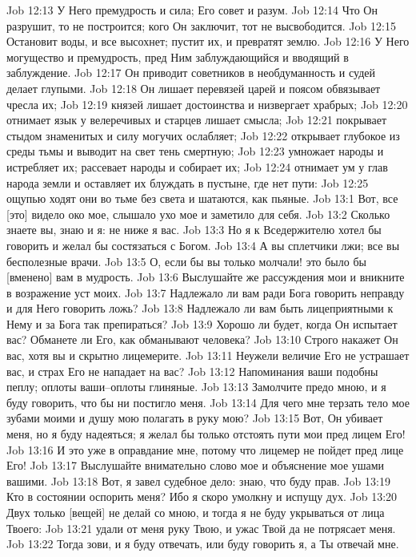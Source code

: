 Job 12:13  У Него премудрость и сила; Его совет и разум.
Job 12:14  Что Он разрушит, то не построится; кого Он заключит, тот не высвободится.
Job 12:15  Остановит воды, и все высохнет; пустит их, и превратят землю.
Job 12:16  У Него могущество и премудрость, пред Ним заблуждающийся и вводящий в заблуждение.
Job 12:17  Он приводит советников в необдуманность и судей делает глупыми.
Job 12:18  Он лишает перевязей царей и поясом обвязывает чресла их;
Job 12:19  князей лишает достоинства и низвергает храбрых;
Job 12:20  отнимает язык у велеречивых и старцев лишает смысла;
Job 12:21  покрывает стыдом знаменитых и силу могучих ослабляет;
Job 12:22  открывает глубокое из среды тьмы и выводит на свет тень смертную;
Job 12:23  умножает народы и истребляет их; рассевает народы и собирает их;
Job 12:24  отнимает ум у глав народа земли и оставляет их блуждать в пустыне, где нет пути:
Job 12:25  ощупью ходят они во тьме без света и шатаются, как пьяные.
Job 13:1  Вот, все [это] видело око мое, слышало ухо мое и заметило для себя.
Job 13:2  Сколько знаете вы, знаю и я: не ниже я вас.
Job 13:3  Но я к Вседержителю хотел бы говорить и желал бы состязаться с Богом.
Job 13:4  А вы сплетчики лжи; все вы бесполезные врачи.
Job 13:5  О, если бы вы только молчали! это было бы [вменено] вам в мудрость.
Job 13:6  Выслушайте же рассуждения мои и вникните в возражение уст моих.
Job 13:7  Надлежало ли вам ради Бога говорить неправду и для Него говорить ложь?
Job 13:8  Надлежало ли вам быть лицеприятными к Нему и за Бога так препираться?
Job 13:9  Хорошо ли будет, когда Он испытает вас? Обманете ли Его, как обманывают человека?
Job 13:10  Строго накажет Он вас, хотя вы и скрытно лицемерите.
Job 13:11  Неужели величие Его не устрашает вас, и страх Его не нападает на вас?
Job 13:12  Напоминания ваши подобны пеплу; оплоты ваши--оплоты глиняные.
Job 13:13  Замолчите предо мною, и я буду говорить, что бы ни постигло меня.
Job 13:14  Для чего мне терзать тело мое зубами моими и душу мою полагать в руку мою?
Job 13:15  Вот, Он убивает меня, но я буду надеяться; я желал бы только отстоять пути мои пред лицем Его!
Job 13:16  И это уже в оправдание мне, потому что лицемер не пойдет пред лице Его!
Job 13:17  Выслушайте внимательно слово мое и объяснение мое ушами вашими.
Job 13:18  Вот, я завел судебное дело: знаю, что буду прав.
Job 13:19  Кто в состоянии оспорить меня? Ибо я скоро умолкну и испущу дух.
Job 13:20  Двух только [вещей] не делай со мною, и тогда я не буду укрываться от лица Твоего:
Job 13:21  удали от меня руку Твою, и ужас Твой да не потрясает меня.
Job 13:22  Тогда зови, и я буду отвечать, или буду говорить я, а Ты отвечай мне.
